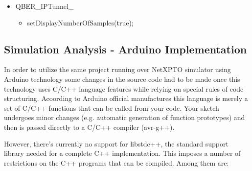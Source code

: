 \begin{refsection}
\begin{itemize}
	\item QBER\_IPTunnel\_
	\begin{itemize}
		\item setDisplayNumberOfSamples(true);
	
	\end{itemize}
\end{itemize}





\subsection{Simulation Analysis - Arduino Implementation}

In order to utilize the same project running over NetXPTO simulator using Arduino technology some changes in the source code had to be made once this technology uses C/C++ language features while relying on special rules of code structuring. Acoording to Arduino official manufactures this language is merely a set of C/C++ functions that can be called from your code. Your sketch undergoes minor changes (e.g. automatic generation of function prototypes) and then is passed directly to a C/C++ compiler (avr-g++). \par However, there's currently no support for libstdc++, the standard support library needed for a complete C++ implementation. This imposes a number of restrictions on the C++ programs that can be compiled. Among them are: 


\end{refsection}
